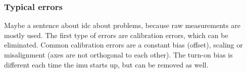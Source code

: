 \subsubsection{Typical  errors}
Maybe a sentence about idc about problems, because raw measurements are mostly used.
The first type of errors are calibration errors, which can be eliminated.
Common calibration errors are a constant bias (offset), scaling or misalignment (axes are not orthogonal to each other).
The turn-on bias is different each time the \gls{imu} starts up, but can be removed as well.


